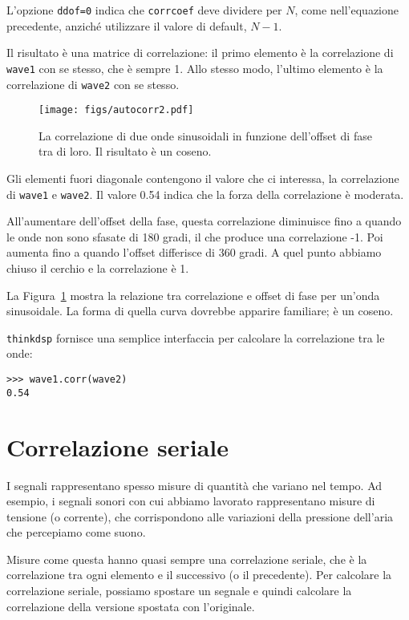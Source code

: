 \documentclass[12pt,a4paper]{book}
\begin{document}
L'opzione {\tt ddof=0} indica che {\tt corrcoef} deve dividere per $N$, come nell'equazione precedente, anziché utilizzare il valore di default, $N-1$.

Il risultato è una matrice di correlazione: il primo elemento è la correlazione di {\tt wave1} con se stesso, che è sempre 1. Allo stesso modo, l'ultimo elemento è la correlazione di {\tt wave2} con se stesso.

\begin{figure} 

\centerline{\texttt{[image: figs/autocorr2.pdf]}} \caption{La correlazione di due onde sinusoidali in funzione dell'offset di fase tra di loro. Il risultato è un coseno.} \label{fig.autocorr2} \end{figure} 

Gli elementi fuori diagonale contengono il valore che ci interessa, la correlazione di {\tt wave1} e {\tt wave2}. Il valore 0.54 indica che la forza della correlazione è moderata.

All'aumentare dell'offset della fase, questa correlazione diminuisce fino a quando le onde non sono sfasate di 180 gradi, il che produce una correlazione -1. Poi aumenta fino a quando l'offset differisce di 360 gradi. A quel punto abbiamo chiuso il cerchio e la correlazione è 1.

La Figura~\ref{fig.autocorr2} mostra la relazione tra correlazione e offset di fase per un'onda sinusoidale. La forma di quella curva dovrebbe apparire familiare; è un coseno.

{\tt thinkdsp} fornisce una semplice interfaccia per calcolare la correlazione tra le onde:

\begin{verbatim} 
>>> wave1.corr(wave2)
0.54
 \end{verbatim} 

\section{Correlazione seriale} 

I segnali rappresentano spesso misure di quantità che variano nel tempo. Ad esempio, i segnali sonori con cui abbiamo lavorato rappresentano misure di tensione (o corrente), che corrispondono alle variazioni della pressione dell'aria che percepiamo come suono.

Misure come questa hanno quasi sempre una correlazione seriale, che è la correlazione tra ogni elemento e il successivo (o il precedente). Per calcolare la correlazione seriale, possiamo spostare un segnale e quindi calcolare la correlazione della versione spostata con l'originale.
\end{document}
